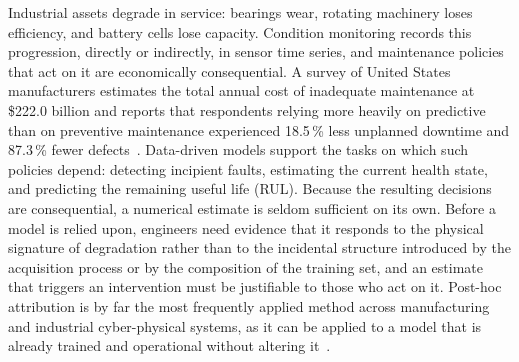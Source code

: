 \documentclass{article}
\begin{document}
Industrial assets degrade in service: bearings wear, rotating machinery loses efficiency, and battery cells lose capacity. Condition monitoring records this progression, directly or indirectly, in sensor time series, and maintenance policies that act on it are economically consequential. A survey of United States manufacturers estimates the total annual cost of inadequate maintenance at \$222.0 billion and reports that respondents relying more heavily on predictive than on preventive maintenance experienced 18.5\,\% less unplanned downtime and 87.3\,\% fewer defects~\cite{thomas2021}. Data-driven models support the tasks on which such policies depend: detecting incipient faults, estimating the current health state, and predicting the remaining useful life (RUL). Because the resulting decisions are consequential, a numerical estimate is seldom sufficient on its own. Before a model is relied upon, engineers need evidence that it responds to the physical signature of degradation rather than to the incidental structure introduced by the acquisition process or by the composition of the training set, and an estimate that triggers an intervention must be justifiable to those who act on it. Post-hoc attribution is by far the most frequently applied method across manufacturing and industrial cyber-physical systems, as it can be applied to a model that is already trained and operational without altering it~\cite{electronics13173497}.
 
\end{document}
